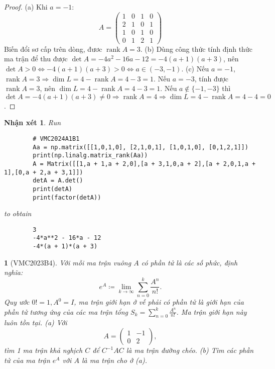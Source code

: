 \documentclass{article}
\newtheorem{baitoan}{}
\newtheorem{nhanxet}{Nhận xét}
\begin{document}
\begin{proof}
	(a) Khi $a = -1$:
	\begin{equation}
		A = \begin{pmatrix}
			1 & 0 & 1 & 0\\2 & 1 & 0 & 1\\1 & 0 & 1 & 0\\0 &1 & 2 & 1
		\end{pmatrix}
	\end{equation}
	Biến đổi sơ cấp trên dòng, đươc $\operatorname{rank}A = 3$. (b) Dùng công thức tính định thức ma trận để thu được $\det A = -4a^2 - 16a - 12 = -4(a + 1)(a + 3)$, nên $\det A > 0\Leftrightarrow-4(a + 1)(a + 3) > 0\Leftrightarrow a\in(-3,-1)$. (c) Nếu $a = -1$, $\operatorname{rank}A = 3\Rightarrow\dim L = 4 - \operatorname{rank}A = 4 - 3 = 1$. Nếu $a = -3$, tính được $\operatorname{rank}A = 3$, nên $\dim L = 4 - \operatorname{rank}A = 4 - 3 = 1$. Nếu $a\notin\{-1,-3\}$ thì $\det A = -4(a + 1)(a + 3)\ne0\Rightarrow\operatorname{rank}A = 4\Rightarrow\dim L = 4 - \operatorname{rank}A = 4 - 4 = 0$.	
\end{proof}

\begin{nhanxet}
	Run
	\begin{verbatim}
		# VMC2024A1B1
		Aa = np.matrix([[1,0,1,0], [2,1,0,1], [1,0,1,0], [0,1,2,1]])
		print(np.linalg.matrix_rank(Aa))
		A = Matrix([[1,a + 1,a + 2,0],[a + 3,1,0,a + 2],[a + 2,0,1,a + 1],[0,a + 2,a + 3,1]])
		detA = A.det()
		print(detA)
		print(factor(detA))
	\end{verbatim}
	to obtain
	\begin{verbatim}
		3
		-4*a**2 - 16*a - 12
		-4*(a + 1)*(a + 3)
	\end{verbatim}
\end{nhanxet}

\begin{baitoan}[VMC2023B4]
	Với mỗi ma trận vuông $A$ có phần tử là các số phức, định nghĩa:
	\begin{equation*}
		e^A\coloneqq\lim_{k\to\infty} \sum_{n=0}^k \frac{A^n}{n!}.
	\end{equation*}
	Quy ước $0! = 1,A^0 = I$, ma trận giới hạn ở vế phải có phần tử là giới hạn của phần tử tương ứng của các ma trận tổng $S_k = \sum_{n=0}^k \frac{A^n}{n!}$. Ma trận giới hạn này luôn tồn tại. (a) Với
	\begin{equation*}
		A = \begin{pmatrix}
			1 & -1\\0 & 2
		\end{pmatrix},
	\end{equation*}
	tìm 1 ma trận khả nghịch $C$ để $C^{-1}AC$ là ma trận đường chéo. (b) Tìm các phần tử của ma trận $e^A$ với $A$ là ma trận cho ở (a).
\end{baitoan}
\end{document}
